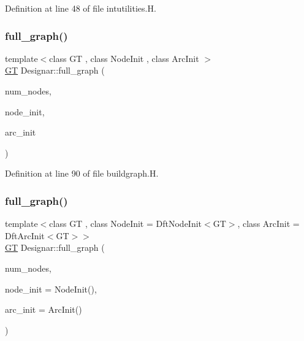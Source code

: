 Definition at line 48 of file intutilities.\+H.

\mbox{\label{namespace_designar_a8d424cb12f90b415f71463d919979437}} 
\subsubsection{\texorpdfstring{full\+\_\+graph()}{full\_graph()}\hspace{0.1cm}{\footnotesize\ttfamily [1/2]}}
{\footnotesize\ttfamily template$<$class GT , class Node\+Init , class Arc\+Init $>$ \\
\hyperlink{demo-buildgraph_8_c_a3001c40d2c31ca87ed96cd7d1334a55e}{GT} Designar\+::full\+\_\+graph (\begin{DoxyParamCaption}\item[{\hyperlink{namespace_designar_aa72662848b9f4815e7bf31a7cf3e33d1}{nat\+\_\+t}}]{num\+\_\+nodes,  }\item[{Node\+Init \&}]{node\+\_\+init,  }\item[{Arc\+Init \&}]{arc\+\_\+init }\end{DoxyParamCaption})}



Definition at line 90 of file buildgraph.\+H.

\mbox{\label{namespace_designar_aa06a68f735d6f8086fe2c5f4cd8062f1}} 
\subsubsection{\texorpdfstring{full\+\_\+graph()}{full\_graph()}\hspace{0.1cm}{\footnotesize\ttfamily [2/2]}}
{\footnotesize\ttfamily template$<$class GT , class Node\+Init  = Dft\+Node\+Init$<$\+G\+T$>$, class Arc\+Init  = Dft\+Arc\+Init$<$\+G\+T$>$$>$ \\
\hyperlink{demo-buildgraph_8_c_a3001c40d2c31ca87ed96cd7d1334a55e}{GT} Designar\+::full\+\_\+graph (\begin{DoxyParamCaption}\item[{\hyperlink{namespace_designar_aa72662848b9f4815e7bf31a7cf3e33d1}{nat\+\_\+t}}]{num\+\_\+nodes,  }\item[{Node\+Init \&\&}]{node\+\_\+init = {\ttfamily NodeInit()},  }\item[{Arc\+Init \&\&}]{arc\+\_\+init = {\ttfamily ArcInit()} }\end{DoxyParamCaption})}



